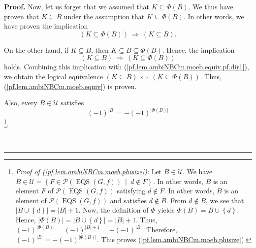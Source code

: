 \documentclass[numbers=enddot,12pt,final,onecolumn,notitlepage]{scrartcl}%
\theoremstyle{definition}
\newenvironment{proof}[1][Proof]{\noindent\textbf{#1.} }{\ \rule{0.5em}{0.5em}}
\newenvironment{verlong}{}{}
\begin{document}
\begin{proof}
\begin{verlong}
Now, let us forget that we assumed that $K\subseteq\Phi\left(  B\right)  $. We
thus have proven that $K\subseteq B$ under the assumption that $K\subseteq
\Phi\left(  B\right)  $. In other words, we have proven the implication%
\begin{equation}
\left(  K\subseteq\Phi\left(  B\right)  \right)  \ \Longrightarrow\ \left(
K\subseteq B\right)  . \label{pf.lem.ambiNBCm.moeb.equiv.pf.dir1}%
\end{equation}


On the other hand, if $K\subseteq B$, then $K\subseteq B\subseteq\Phi\left(
B\right)  $. Hence, the implication%
\[
\left(  K\subseteq B\right)  \ \Longrightarrow\ \left(  K\subseteq\Phi\left(
B\right)  \right)
\]
holds. Combining this implication with
(\ref{pf.lem.ambiNBCm.moeb.equiv.pf.dir1}), we obtain the logical equivalence
$\left(  K\subseteq B\right)  \ \Longleftrightarrow\ \left(  K\subseteq
\Phi\left(  B\right)  \right)  $. Thus, (\ref{pf.lem.ambiNBCm.moeb.equiv}) is proven.

Also, every $B\in\mathcal{U}$ satisfies%
\begin{equation}
\left(  -1\right)  ^{\left\vert B\right\vert }=-\left(  -1\right)
^{\left\vert \Phi\left(  B\right)  \right\vert }
\label{pf.lem.ambiNBCm.moeb.phisize}%
\end{equation}
\footnote{\textit{Proof of (\ref{pf.lem.ambiNBCm.moeb.phisize}):} Let
$B\in\mathcal{U}$. We have $B\in\mathcal{U}=\left\{  F\in\mathcal{P}\left(
\operatorname*{EQS}\left(  G,f\right)  \right)  \ \mid\ d\notin F\right\}  $.
In other words, $B$ is an element $F$ of $\mathcal{P}\left(
\operatorname*{EQS}\left(  G,f\right)  \right)  $ satisfying $d\notin F$. In
other words, $B$ is an element of $\mathcal{P}\left(  \operatorname*{EQS}%
\left(  G,f\right)  \right)  $ and satisfies $d\notin B$. From $d\notin B$, we
see that $\left\vert B\cup\left\{  d\right\}  \right\vert =\left\vert
B\right\vert +1$. Now, the definition of $\Phi$ yields $\Phi\left(  B\right)
=B\cup\left\{  d\right\}  $. Hence, $\left\vert \Phi\left(  B\right)
\right\vert =\left\vert B\cup\left\{  d\right\}  \right\vert =\left\vert
B\right\vert +1$. Thus, $\left(  -1\right)  ^{\left\vert \Phi\left(  B\right)
\right\vert }=\left(  -1\right)  ^{\left\vert B\right\vert +1}=-\left(
-1\right)  ^{\left\vert B\right\vert }$. Therefore, $\left(  -1\right)
^{\left\vert B\right\vert }=-\left(  -1\right)  ^{\left\vert \Phi\left(
B\right)  \right\vert }$. This proves (\ref{pf.lem.ambiNBCm.moeb.phisize}).}.


\end{verlong}
\end{proof}
\end{document}

